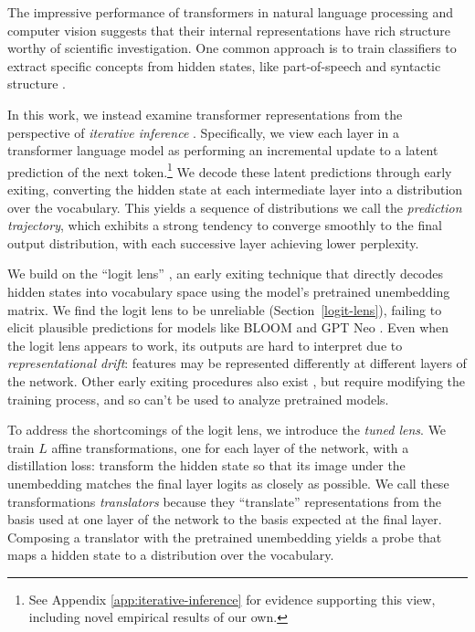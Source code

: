 \documentclass{article}
\theoremstyle{plain}
\theoremstyle{definition}
\begin{document}
\printAffiliationsAndNotice{}
The impressive performance of transformers in natural language processing \cite{brown2020language} and computer vision \cite{dosovitskiy2020image} suggests that their internal representations have rich structure worthy of scientific investigation. One common approach is to train classifiers to extract specific concepts from hidden states, like part-of-speech and syntactic structure \cite{hewitt2019structural, tucker2021if, li2022emergent}.

In this work, we instead examine transformer representations from the perspective of \emph{iterative inference} \cite{jastrzkebski2017residual}. Specifically, we view each layer in a transformer language model as performing an incremental update to a latent prediction of the next token.\footnote{See Appendix \ref{app:iterative-inference} for evidence supporting this view, including novel empirical results of our own.} We decode these latent predictions through early exiting, converting the hidden state at each intermediate layer into a distribution over the vocabulary. This yields a sequence of distributions we call the \emph{prediction trajectory}, which exhibits a strong tendency to converge smoothly to the final output distribution, with each successive layer achieving lower perplexity.

We build on the ``logit lens'' \cite{nostalgebraist2020logitlens}, an early exiting technique that directly decodes hidden states into vocabulary space using the model's pretrained unembedding matrix. We find the logit lens to be unreliable (Section~\ref{logit-lens}), failing to elicit plausible predictions for models like BLOOM \cite{scao2022bloom} and GPT Neo \cite{black2021gpt}. Even when the logit lens appears to work, its outputs are hard to interpret due to \emph{representational drift}: features may be represented differently at different layers of the network. Other early exiting procedures also exist \cite{schuster2022confident}, but require modifying the training process, and so can't be used to analyze pretrained models.

To address the shortcomings of the logit lens, we introduce the \emph{tuned lens}. We train $L$ affine transformations, one for each layer of the network, with a distillation loss: transform the hidden state so that its image under the unembedding matches the final layer logits as closely as possible. We call these transformations \emph{translators} because they ``translate'' representations from the basis used at one layer of the network to the basis expected at the final layer. Composing a translator with the pretrained unembedding yields a probe \cite{alain2016understanding} that maps a hidden state to a distribution over the vocabulary.
\end{document}
